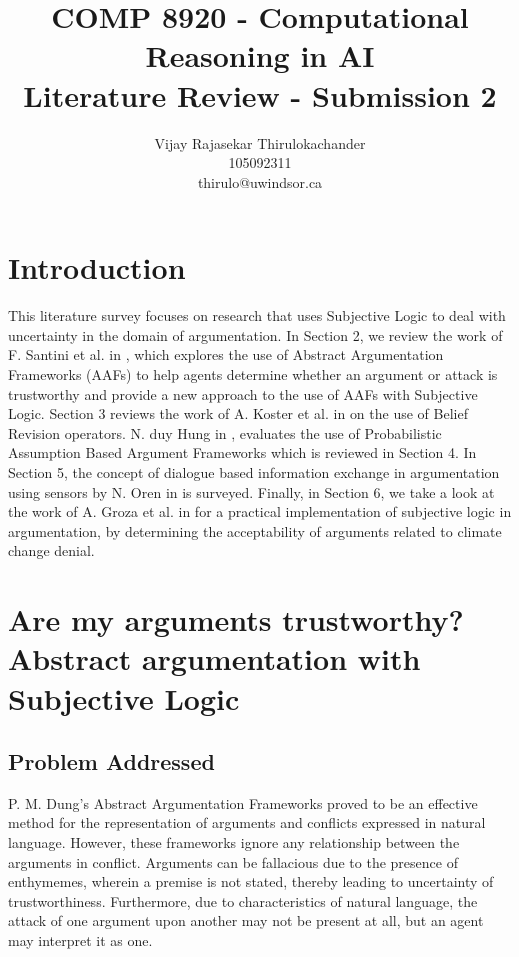 \documentclass[UTF8]{article}
\begin{document}
\title{%
    COMP 8920 - Computational Reasoning in AI \\
  \large Literature Review - Submission 2\\}

\author{%
    Vijay Rajasekar Thirulokachander\\
    105092311\\
    \large thirulo@uwindsor.ca}
\date{}
\maketitle

\section{Introduction}
This literature survey focuses on research that uses Subjective Logic to deal with uncertainty in the domain of argumentation. 
In Section 2, we review the work of F. Santini et al. in \cite{8455455}, which explores the use of Abstract Argumentation Frameworks (AAFs) to help agents determine whether an argument or attack 
is trustworthy and provide a new approach to the use of AAFs with Subjective Logic. Section 3 reviews the work of A. Koster et al. in \cite{Koster2017} on the use of Belief Revision operators. 
N. duy Hung in \cite{8023355}, evaluates the use of Probabilistic Assumption Based Argument Frameworks which is reviewed in Section 4.  In Section 5, the concept of 
dialogue based information exchange in argumentation using sensors by N. Oren in \cite{OREN2007838} is surveyed. Finally, in Section 6, we take a look 
at the work of A. Groza et al. in \cite{8516616} for a practical implementation of subjective logic in argumentation, by determining the acceptability of arguments related to climate change denial.

\section{Are my arguments trustworthy? Abstract argumentation with Subjective Logic}
\subsection{Problem Addressed}
P. M. Dung's Abstract Argumentation Frameworks\cite{DUNG1995321} proved to be an effective method for the 
representation of arguments and conflicts expressed in natural language. However, these frameworks ignore any 
relationship between the arguments in conflict. Arguments can be fallacious due to the presence of enthymemes, 
wherein a premise is not stated, thereby leading to uncertainty of trustworthiness. 
Furthermore, due to characteristics of natural language, the attack of one argument upon another may not be present at all, but an agent may interpret it as one. 
\end{document}
